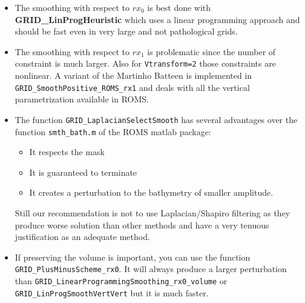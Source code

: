 \documentclass[12pt]{article}
\begin{document}
\begin{itemize}
\item The smoothing with respect to $rx_0$ is best done with 
{\bf GRID\_LinProgHeuristic} which uses a linear programming approach
and should be fast even in very large and not pathological grids.
\item The smoothing with respect to $rx_1$ is problematic since
the number of constraint is much larger. Also for {\tt Vtransform=2}
those constraints are nonlinear. A variant of the Martinho Batteen 
\cite{martinho} is
implemented in {\tt GRID\_SmoothPositive\_ROMS\_rx1} and deals with
all the vertical parametrization available in ROMS.
\item The function {\tt GRID\_LaplacianSelectSmooth} has several
advantages over the function {\tt smth\_bath.m} of the ROMS matlab
package:
\begin{itemize}
\item It respects the mask
\item It is guaranteed to terminate
\item It creates a perturbation to the bathymetry of smaller amplitude.
\end{itemize}
Still our recommendation is not to use Laplacian/Shapiro filtering
as they produce worse solution than other methods and have a very
tenuous justification as an adequate method.
\item If preserving the volume is important, you can use 
the function {\tt GRID\_PlusMinusScheme\_rx0}. It will always produce
a larger perturbation than {\tt GRID\_LinearProgrammingSmoothing\_rx0\_volume}
or {\tt GRID\_LinProgSmoothVertVert} but it is much faster.
\end{itemize}
\end{document}
